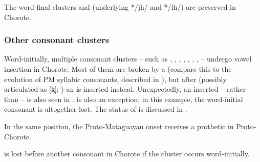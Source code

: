 \begin{exe}
    \ex \heavyv
    \ex \roast
    \ex \nightmonkey
    \ex \girl
    \ex \orphancwpl
    \ex \throwcw
    \ex \rhea
    \ex \doradocw
\end{exe}

The word-final clusters  and  (underlying */jh/ and */lh/) are preserved in Chorote.

\begin{exe}
    \ex \plaj
    \ex \distal
    \ex \soul
\end{exe}

\subsubsection{Other consonant clusters}\label{ch-clusters}

Word-initially, multiple consonant clusters -- such as , , , , , , ,  -- undergo vowel insertion in Chorote. Most of them are broken by a  (compare this to the evolution of PM syllabic consonants, described in ), but after  (possibly articulated as [k̟]; ) an  is inserted instead. Unexpectedly, an inserted  -- rather than  -- is also seen in .  is also an exception; in this example, the word-initial consonant is altogether lost. The status of  is discussed in .

\begin{exe}
    \ex \north
    \ex \suncho \label{ch-fts-suncho}
    \ex \palm \label{ch-fts-palm}
    \ex \skunk
    \ex \tortoise
    \ex \whitealgarrobof
    \ex \wildcat
    \ex \precipice
    \ex \blind
    \ex \metal
\end{exe}

In the same position, the Proto-Mataguayan onset  receives a prothetic  in Proto-Chorote.

\begin{exe}
    \ex \whitequebracho
    \ex \kingvulture
    \ex \cardon
    \ex \chachalaca
\end{exe}

 is lost before another consonant in Chorote if the cluster occurs word-initially.

\begin{exe}
    \ex \flu
    \ex \squash
\end{exe}

